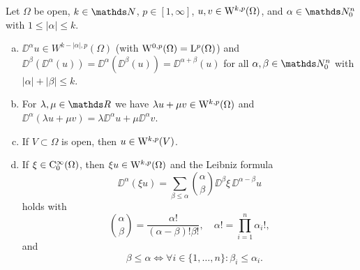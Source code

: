 \begin{prop}
  \label{prop:sobolevProperties}
  Let $\Omega$ be open, $k \in \N$, $p \in [1,\infty]$, $u,v \in \mathrm{W}^{k,p}(\Omega)$, and $\alpha \in \N_0^n$ with $1 \leq |\alpha| \leq k$.
  \begin{enumerate}[a)]
    \item $\DD^\alpha u \in W^{k - |\alpha|,p}(\Omega)$ (with $\mathrm{W}^{0,p}(\Omega) = \mathrm{L}^p(\Omega)$) and $\DD^\beta (\DD^\alpha (u)) = \DD^\alpha (\DD^\beta(u)) = \DD^{\alpha + \beta}(u)$ for all $\alpha, \beta \in \N_0^n$ with $|\alpha| + |\beta| \leq k$.
    \item For $\lambda, \mu \in \R$ we have $\lambda u + \mu v \in \mathrm{W}^{k,p}(\Omega)$ and $\DD^\alpha(\lambda u + \mu v) = \lambda \DD^\alpha u + \mu \DD^\alpha v$.
    \item If $V \subset \Omega$ is open, then $u \in \mathrm{W}^{k,p}(V)$.
    \item If $\xi \in \mathrm{C}_0^\infty(\Omega)$, then $\xi u \in \mathrm{W}^{k,p}(\Omega)$ and the Leibniz formula
      $$
      \DD^\alpha(\xi u) = \sum_{\beta \leq \alpha} \binom{\alpha}{\beta} \DD^\beta\xi \, \DD^{\alpha - \beta} u
      $$
      holds with 
      $$\binom{\alpha}{\beta} = \frac{\alpha!}{(\alpha -\beta)! \beta!}, \quad \alpha! = \prod_{i = 1}^n \alpha_i!,$$
      and
      $$\quad \beta \leq \alpha \iff \forall i \in \{1,\dots,n\}\colon \beta_i \leq \alpha_i.$$
  \end{enumerate}
\end{prop}

